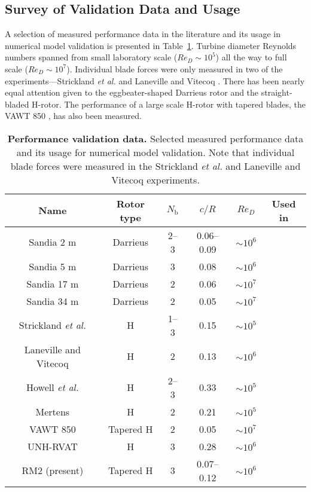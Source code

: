 \subsection{Survey of Validation Data and Usage}

A selection of measured performance data in the literature and its usage in
numerical model validation is presented in Table~\ref{tab:validation-data}.
Turbine diameter Reynolds numbers spanned from small laboratory scale ($Re_D
\sim 10^5$) all the way to full scale ($Re_D \sim 10^7$). Individual blade
forces were only measured in two of the experiments---Strickland \emph{et al.}
\cite{Strickland1981} and Laneville and Vitecoq \cite{Laneville1986}. There has
been nearly equal attention given to the eggbeater-shaped Darrieus rotor and the
straight-bladed H-rotor. The performance of a large scale H-rotor with tapered
blades, the VAWT 850 \cite{Mays1990}, has also been measured.

\begin{table}
    \centering
    
    \begin{tabular}{c|c|c|c|c|c}
        Name & Rotor type & $N_\mathrm{b}$ & $c/R$ & $Re_D$ & Used in \\ 
        \hline
        Sandia 2 m \cite{Blackwell1976} &  Darrieus  & 2--3 & 0.06--0.09 & $\sim 10^6$ & \cite{Roh2013,Bedon2014} \\ 
        Sandia 5 m \cite{Sheldahl1977} &  Darrieus  & 3 & 0.08 & $\sim 10^6$ & \cite{Antheaume2008,Bedon2014} \\ 
        Sandia 17 m \cite{Worstell1978} & Darrieus  & 2 & 0.06 & $\sim 10^7$ & \cite{Para1988,Orlandi2015,Bedon2014} \\ 
        Sandia 34 m \cite{Ashwill1992} & Darrieus  & 2 & 0.05 & $\sim 10^7$ & \cite{Liu1992,Murray2011,Bedon2014}  \\ 
        Strickland \emph{et al.} \cite{Strickland1981} & H & 1--3 & 0.15 & $\sim 10^5$ & \cite{Ponta2001,Scheurich2011b} \\ 
        Laneville and Vitecoq \cite{Laneville1986} & H & 2 & 0.13 & $\sim 10^6$ & \cite{Amet2009} \\ 
        Howell \emph{et al.} \cite{Howell2010} & H & 2--3 & 0.33 & $\sim 10^5$ & \cite{Joo2015} \\ 
        Mertens \cite{Mertens2003} & H & 2 & 0.21 & $\sim 10^5$ & \cite{Orlandi2015} \\ 
        VAWT 850 \cite{Mays1990} & Tapered H & 2 & 0.05 & $\sim 10^7$ & \cite{Murray2011} \\ 
        UNH-RVAT \cite{Bachant2014-RVAT-baseline} & H & 3 & 0.28 & $\sim 10^6$ & \cite{Michelen2014} \\
        RM2 (present) & Tapered H & 3 & 0.07--0.12 & $\sim 10^6$ & 
    \end{tabular}     
    
    \caption{\textbf{Performance validation data.} Selected measured performance
        data and its usage for numerical model validation. Note that individual
        blade forces were measured in the Strickland \emph{et al.} and Laneville and
        Vitecoq experiments.}
    
    \label{tab:validation-data}
\end{table}

